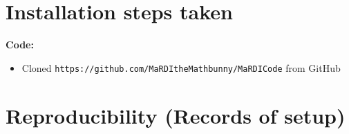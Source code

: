 \documentclass[10pt]{article}
\begin{document}
\section{Installation steps taken}






% 

\textbf{Code:}
\begin{itemize}
\item Cloned \verb|https://github.com/MaRDItheMathbunny/MaRDICode| from GitHub  
\end{itemize} %

\section{Reproducibility (Records of setup)}


\end{document}
